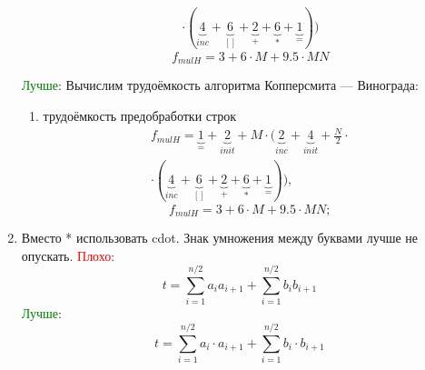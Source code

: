 \begin{enumerate}
\begin{enumerate}
\begin{equation}
\begin{gathered}
				\cdot (\underbrace{4}_{inc} + \underbrace{6}_{[]} + \underbrace{2}_{+} +\underbrace{6}_{*} + \underbrace{1}_{=}))
			\end{gathered}
		\end{equation}
		\begin{equation}
			f_{mulH} = 3 + 6 \cdot M + 9.5 \cdot MN
		\end{equation}
	\end{enumerate}
	\textcolor{green}{Лучше}:\newline
	Вычислим трудоёмкость алгоритма Копперсмита — Винограда:
	\begin{enumerate}
		\item трудоёмкость предобработки строк
		\begin{equation}
			\begin{gathered}
				f_{mulH} = \underbrace{1}_{=} + \underbrace{2}_{init} + M \cdot (\underbrace{2}_{inc} + \underbrace{4}_{init} + \frac{N}{2} \cdot \\
				\cdot (\underbrace{4}_{inc} + \underbrace{6}_{[]} + \underbrace{2}_{+} +\underbrace{6}_{*} + \underbrace{1}_{=})),
			\end{gathered}
		\end{equation}
		\begin{equation}
			f_{mulH} = 3 + 6 \cdot M + 9.5 \cdot MN;
		\end{equation}
	\end{enumerate}

\clearpage
	\item Вместо * использовать cdot. Знак умножения между буквами лучше не опускать.\newline
	\textcolor{red}{Плохо}:
	\begin{equation}
		\label{t}
		t = \sum_{i=1}^{n/2} a_{i}a_{i+1} + \sum_{i=1}^{n/2} b_{i}b_{i+1}
	\end{equation}
	\newline
	\textcolor{green}{Лучше}:
	\begin{equation}
		\label{t}
		t = \sum_{i=1}^{n/2} a_{i} \cdot a_{i+1} + \sum_{i=1}^{n/2} b_{i} \cdot b_{i+1}
	\end{equation}


\end{enumerate}
